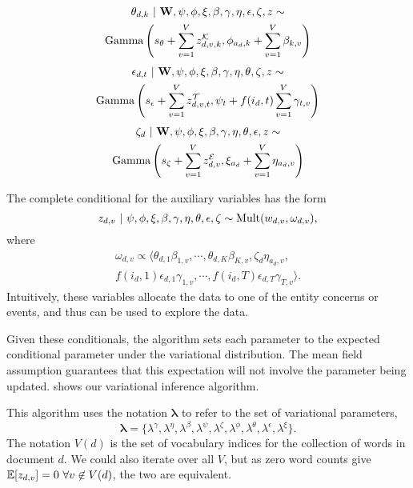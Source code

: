 \begin{multline}
\theta_{d,k} ~\vert~ \mathbf{W}, \psi, \phi, \xi, \beta, \gamma, \eta, \epsilon, \zeta, z \sim \\
	\mbox{Gamma}\left(
		s_\theta + \sum_{v=1}^V z^\mathcal{K}_{d,v,k},
		\phi_{a_d,k} + \sum_{v=1}^V \beta_{k,v}
	\right)
\label{eq:theta}
\end{multline}
\begin{multline}
\epsilon_{d,t} ~\vert~ \mathbf{W}, \psi, \phi, \xi, \beta, \gamma, \eta, \theta, \zeta, z \sim \\
	\mbox{Gamma}\left(
		s_\epsilon + \sum_{v=1}^V z^\mathcal{T}_{d,v,t},
		\psi_t + f(i_d, t) \sum_{v=1}^V \gamma_{t,v}
	\right)
\label{eq:epsilon}
\end{multline}
\begin{multline}
\zeta_{d} ~\vert~ \mathbf{W}, \psi, \phi, \xi, \beta, \gamma, \eta, \theta, \epsilon, z \sim \\
	\mbox{Gamma}\left(
		s_\zeta + \sum_{v=1}^V z^\mathcal{E}_{d,v},
		\xi_{a_d} + \sum_{v=1}^V \eta_{a_d,v}
	\right)
\label{eq:zeta}
\end{multline}

The complete conditional for the auxiliary variables has the form
\[z_{d,v} ~\vert~ \psi, \phi, \xi, \beta, \gamma, \eta, \theta, \epsilon, \zeta \sim \mbox{Mult}(w_{d,v}, \omega_{d,v}),\] where
\begin{multline}
\omega_{d,v} \propto \langle 
\theta_{d,1} \beta_{1,v}, \cdots, \theta_{d,K} \beta_{K,v}, \zeta_d \eta_{a_d,v}, \\
f(i_d, 1) \epsilon_{d,1} \gamma_{1,v}, \cdots, f(i_d, T) \epsilon_{d,T} \gamma_{T,v}\rangle.
\label{eq:omega}
\end{multline}
Intuitively, these variables allocate the data to one of the entity concerns or events, and thus can be used to explore the data.

Given these conditionals, the algorithm sets each parameter to the expected conditional parameter under the variational distribution. The mean field assumption guarantees that this expectation will not involve the parameter being updated.   shows our variational inference algorithm.

This algorithm uses the notation $\mathbold{\lambda}$ to refer to the set of variational parameters,
\[\mathbold{\lambda} = \{\lambda^\gamma, \lambda^\eta, \lambda^\beta, \lambda^\psi, \lambda^\zeta, \lambda^\phi, \lambda^\theta, \lambda^\epsilon, \lambda^\xi\}.\] The notation $V(d)$ is the set of vocabulary indices for the collection of words in document $d$.  We could also iterate over all $V$, but as zero word counts give $\mathbb{E}[z_{d,v}] = 0~\forall v \not\in V(d)$, the two are equivalent.


